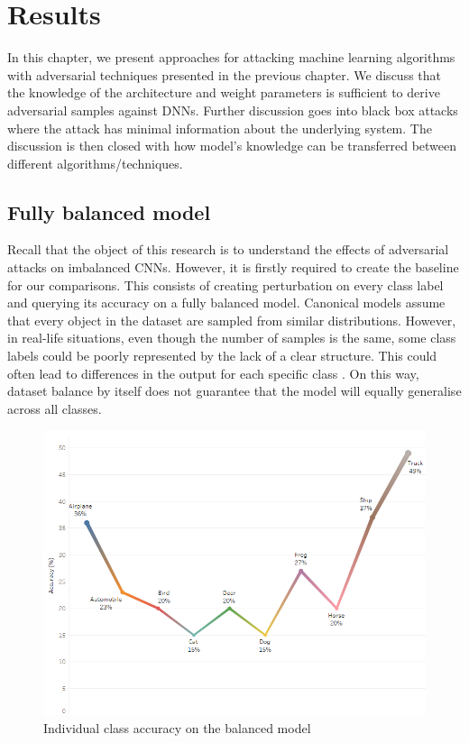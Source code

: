 

\chapter{Results}

In this chapter, we present approaches for attacking machine learning algorithms with adversarial techniques presented in the previous chapter. We discuss that the knowledge of the architecture and weight parameters is sufficient to derive adversarial samples against DNNs. Further discussion goes into black box attacks where the attack has minimal information about the underlying system. The discussion is then closed with how model's knowledge can be transferred between different algorithms/techniques.

\section{Fully balanced model}

Recall that the object of this research is to understand the effects of adversarial attacks on imbalanced CNNs. However, it is firstly required to create the baseline for our comparisons. This consists of creating perturbation on every class label and querying its accuracy on a fully balanced model. Canonical models assume that every object in the dataset are sampled from similar distributions. However, in real-life situations, even though the number of samples is the same, some class labels could be poorly represented by the lack of a clear structure. This could often lead to differences in the output for each specific class \cite{krawczyk2016learning}. On this way, dataset balance by itself does not guarantee that the model will equally generalise across all classes.
\begin{figure}[H]
	\centering
	\includegraphics[scale=0.7]{balanced_perturbed.png}
	\caption{Individual class accuracy on the balanced model}
	\label{fig:balanced_perturbed}
\end{figure}

